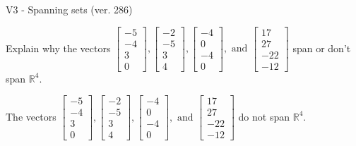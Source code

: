\begin{exercise}
  \begin{exerciseTitle}V3 - Spanning sets (ver. 286)\end{exerciseTitle}
  \begin{exerciseStatement}
    Explain why the vectors \(\left[\begin{array}{r}
-5 \\
-4 \\
3 \\
0
\end{array}\right] , \left[\begin{array}{r}
-2 \\
-5 \\
3 \\
4
\end{array}\right] , \left[\begin{array}{r}
-4 \\
0 \\
-4 \\
0
\end{array}\right] , \text{ and } \left[\begin{array}{r}
17 \\
27 \\
-22 \\
-12
\end{array}\right]\) span or don't span \(\mathbb{R}^4\). 
	


  \end{exerciseStatement}
  \begin{exerciseAnswer}
   The vectors \(\left[\begin{array}{r}
-5 \\
-4 \\
3 \\
0
\end{array}\right] , \left[\begin{array}{r}
-2 \\
-5 \\
3 \\
4
\end{array}\right] , \left[\begin{array}{r}
-4 \\
0 \\
-4 \\
0
\end{array}\right] , \text{ and } \left[\begin{array}{r}
17 \\
27 \\
-22 \\
-12
\end{array}\right]\) 
  	 do not  
	span \(\mathbb{R}^4\).
  


  \end{exerciseAnswer}
\end{exercise}